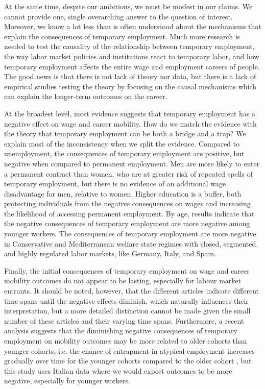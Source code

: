 \documentclass[12pt]{article}
\begin{document}
At the same time, despite our ambitions, we must be modest in our claims.  We cannot provide one, single overarching answer to the question of interest.  Moreover, we know a lot less than is often understood about the mechanisms that explain the consequences of temporary employment.  Much more research is needed to test the causality of the relationship between temporary employment, the way labor market policies and institutions react to temporary labor, and how temporary employment affects the entire wage and employment careers of people.  The good news is that there is not lack of theory nor data, but there is a lack of empirical studies testing the theory by focusing on the causal mechanisms which can explain the longer-term outcomes on the career.  

At the broadest level, most evidence suggests that temporary employment has a negative effect on wage and career mobility.  How do we match the evidence with the theory that temporary employment can be both a bridge and a trap?  We explain most of the inconsistency when we split the evidence.  Compared to unemployment, the consequences of temporary employment are positive, but negative when compared to permanent employment.  Men are more likely to enter a permanent contract than women, who are at greater risk of repeated spells of temporary employment, but there is no evidence of an additional wage disadvantage for men, relative to women.  Higher education is a buffer, both protecting individuals from the negative consequences on wages and increasing the likelihood of accessing permanent employment.  By age, results indicate that the negative consequences of temporary employment are more negative among younger workers.  The consequences of temporary employment are more negative in Conservative and Mediterranean welfare state regimes with closed, segmented, and highly regulated labor markets, like Germany, Italy, and Spain.  

Finally, the initial consequences of temporary employment on wage and career mobility outcomes do not appear to be lasting, especially for labour market entrants.  It should be noted, however, that the different articles indicate different time spans until the negative effects diminish, which naturally influences their interpretation, but a more detailed distinction cannot be made given the small number of these articles and their varying time spans.  Furthermore, a recent analysis suggests that the diminishing negative consequences of temporary employment on mobility outcomes may be more related to older cohorts than younger cohorts, i.e. the chance of entrapment in atypical employment increases gradually over time for the younger cohorts compared to the older cohort \citep{barbieri_etal_2019}, but this study uses Italian data where we would expect outcomes to be more negative, especially for younger workers.  
\end{document}
